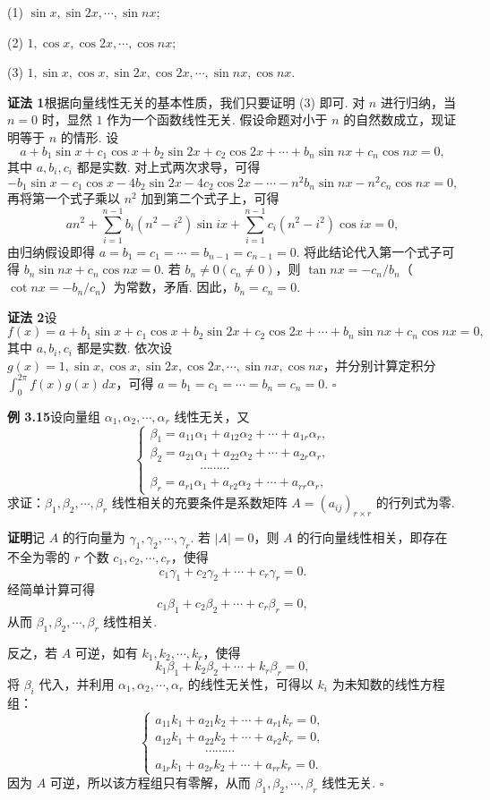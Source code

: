 \documentclass[UTF8,12pt,a4paper,fontset=fandol]{ctexart}
\begin{document}
(1) $\sin x,\sin 2x,\cdots,\sin nx$;

(2) $1,\cos x,\cos 2x,\cdots,\cos nx$;

(3) $1,\sin x,\cos x,\sin 2x,\cos 2x,\cdots,\sin nx,\cos nx$.

\noindent\textbf{证法 1}\quad 根据向量线性无关的基本性质，我们只要证明 (3) 即可. 对 $n$ 进行归纳，当 $n=0$ 时，显然 $1$ 作为一个函数线性无关. 假设命题对小于 $n$ 的自然数成立，现证明等于 $n$ 的情形. 设
\[
a+b_1\sin x+c_1\cos x+b_2\sin 2x+c_2\cos 2x+\cdots+b_n\sin nx+c_n\cos nx=0,
\]
其中 $a,b_i,c_i$ 都是实数. 对上式两次求导，可得
\[
-b_1\sin x-c_1\cos x-4b_2\sin 2x-4c_2\cos 2x-\cdots-n^2b_n\sin nx-n^2c_n\cos nx=0,
\]
再将第一个式子乘以 $n^2$ 加到第二个式子上，可得
\[
an^2+\sum_{i=1}^{n-1}b_i(n^2-i^2)\sin ix+\sum_{i=1}^{n-1}c_i(n^2-i^2)\cos ix=0,
\]
由归纳假设即得 $a=b_1=c_1=\cdots=b_{n-1}=c_{n-1}=0$. 将此结论代入第一个式子可得 $b_n\sin nx+c_n\cos nx=0$. 若 $b_n\ne 0(c_n\ne 0)$，则 $\tan nx=-c_n/b_n$（$\cot nx=-b_n/c_n$）为常数，矛盾. 因此，$b_n=c_n=0$.

\noindent\textbf{证法 2}\quad 设
\[
f(x)=a+b_1\sin x+c_1\cos x+b_2\sin 2x+c_2\cos 2x+\cdots+b_n\sin nx+c_n\cos nx=0,
\]
其中 $a,b_i,c_i$ 都是实数. 依次设 $g(x)=1,\sin x,\cos x,\sin 2x,\cos 2x,\cdots,\sin nx,\cos nx$，并分别计算定积分 $\int_0^{2\pi}f(x)g(x)\,dx$，可得 $a=b_1=c_1=\cdots=b_n=c_n=0$. $\square$

\noindent\textbf{例 3.15}\quad 设向量组 $\alpha_1,\alpha_2,\cdots,\alpha_r$ 线性无关，又
\[
\left\{
\begin{array}{l}
\beta_1=a_{11}\alpha_1+a_{12}\alpha_2+\cdots+a_{1r}\alpha_r,\\
\beta_2=a_{21}\alpha_1+a_{22}\alpha_2+\cdots+a_{2r}\alpha_r,\\
\hspace{4em}\cdots\cdots\cdots\\
\beta_r=a_{r1}\alpha_1+a_{r2}\alpha_2+\cdots+a_{rr}\alpha_r,
\end{array}
\right.
\]
求证：$\beta_1,\beta_2,\cdots,\beta_r$ 线性相关的充要条件是系数矩阵 $A=(a_{ij})_{r\times r}$ 的行列式为零.

\noindent\textbf{证明}\quad 记 $A$ 的行向量为 $\gamma_1,\gamma_2,\cdots,\gamma_r$. 若 $|A|=0$，则 $A$ 的行向量线性相关，即存在不全为零的 $r$ 个数 $c_1,c_2,\cdots,c_r$，使得
\[
c_1\gamma_1+c_2\gamma_2+\cdots+c_r\gamma_r=0.
\]
经简单计算可得
\[
c_1\beta_1+c_2\beta_2+\cdots+c_r\beta_r=0,
\]
从而 $\beta_1,\beta_2,\cdots,\beta_r$ 线性相关.

反之，若 $A$ 可逆，如有 $k_1,k_2,\cdots,k_r$，使得
\[
k_1\beta_1+k_2\beta_2+\cdots+k_r\beta_r=0,
\]
将 $\beta_i$ 代入，并利用 $\alpha_1,\alpha_2,\cdots,\alpha_r$ 的线性无关性，可得以 $k_i$ 为未知数的线性方程组：
\[
\left\{
\begin{array}{l}
a_{11}k_1+a_{21}k_2+\cdots+a_{r1}k_r=0,\\
a_{12}k_1+a_{22}k_2+\cdots+a_{r2}k_r=0,\\
\hspace{4em}\cdots\cdots\cdots\\
a_{1r}k_1+a_{2r}k_2+\cdots+a_{rr}k_r=0.
\end{array}
\right.
\]
因为 $A$ 可逆，所以该方程组只有零解，从而 $\beta_1,\beta_2,\cdots,\beta_r$ 线性无关. $\square$
\end{document}
